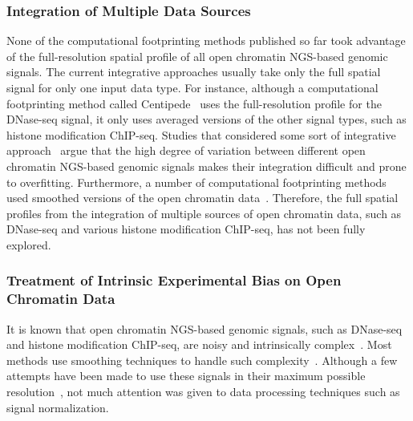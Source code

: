\subsubsection{Integration of Multiple Data Sources}

None of the computational footprinting methods published so far took advantage of the full-resolution spatial profile of all open chromatin NGS-based genomic signals. The current integrative approaches usually take only the full spatial signal for only one input data type. For instance, although a computational footprinting method called Centipede~\citep{pique2011} uses the full-resolution profile for the DNase-seq signal, it only uses averaged versions of the other signal types, such as histone modification ChIP-seq. Studies that considered some sort of integrative approach~\citep{pique2011,cuellar2012,sherwood2014,kahara2015} argue that the high degree of variation between different open chromatin NGS-based genomic signals makes their integration difficult and prone to overfitting. Furthermore, a number of computational footprinting methods used smoothed versions of the open chromatin data~\citep{cuellar2012,sherwood2014,kahara2015}. Therefore, the full spatial profiles from the integration of multiple sources of open chromatin data, such as DNase-seq and various histone modification ChIP-seq, has not been fully explored.

\subsubsection{Treatment of Intrinsic Experimental Bias on Open Chromatin Data}

It is known that open chromatin NGS-based genomic signals, such as DNase-seq and histone modification ChIP-seq, are noisy and intrinsically complex~\citep{meyer2014}. Most methods use smoothing techniques to handle such complexity~\citep{pique2011,cuellar2012,sherwood2014,kahara2015}. Although a few attempts have been made to use these signals in their maximum possible resolution~\citep{boyle2011,sung2014}, not much attention was given to data processing techniques such as signal normalization.

